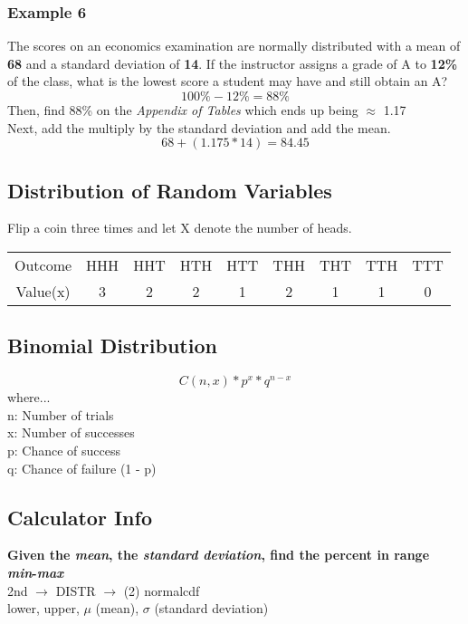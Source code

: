 \documentclass[twocolumn]{article}
\newcommand*\ra{$\rightarrow$ }
\newcommand{\bd}{\textbf}
\begin{document}
	\subsubsection*{Example 6}
	The scores on an economics examination are normally distributed with a mean of \bd{68} and a standard deviation of \bd{14}. If the instructor assigns a grade of A to \bd{12\%} of the class, what is the lowest score a student may have and still obtain an A? \\
	\begin{equation*}
		100\% - 12\% = 88\%
	\end{equation*}
	Then, find 88\% on the \emph{Appendix of Tables} which ends up being $\approx$ 1.17 \\
	Next, add the multiply by the standard deviation and add the mean.
	\begin{equation*}
		68 + (1.175 * 14) = 84.45
	\end{equation*}
	
	\subsection*{Distribution of Random Variables}
	Flip a coin three times and let X denote the number of heads.
	\begin{center}
		\begin{tabular}{ |c|c|c|c|c|c|c|c|c| }
			\hline 
			Outcome & HHH & HHT & HTH & HTT & THH & THT & TTH &  TTT \\
			Value(x) & 3 & 2 & 2 & 1 & 2 & 1 & 1 & 0 \\
			\hline
		\end{tabular}
	\end{center}
	
	\subsection*{Binomial Distribution}
	\begin{equation*}
		C(n, x) * p^x * q^{n - x}
	\end{equation*}
	where... \\
	\indent n: Number of trials \\
	\indent x: Number of successes \\
	\indent p: Chance of success \\
	\indent q: Chance of failure (1 - p) 
	
	\subsection*{Calculator Info}
	\bd{Given the \emph{mean}, the \emph{standard deviation}, find the percent in range \emph{min}-\emph{max}} \\
	\indent 2nd \ra DISTR \ra (2) normalcdf \\
	\indent lower, upper, $\mu$ (mean), $\sigma$ (standard deviation) \\
	
\end{document}
